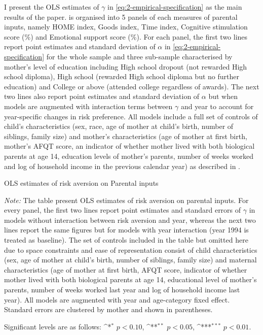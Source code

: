 \documentclass[]{article}
\begin{document}
I present the OLS estimates of $\gamma$ in \eqref{eq:2-empirical-specification}  as the main results of the paper.  is organised into 5 panels of each measures of parental inputs, namely HOME index, Goods index, Time index, Cognitive stimulation score (\%) and Emotional support score (\%). For each panel, the first two lines report point estimates and standard deviation of $\alpha$ in \eqref{eq:2-empirical-specification} for the whole sample and three sub-sample characterised by mother's level of education including High school dropout (not rewarded High school diploma), High school (rewarded High school diploma but no further education) and College or above (attended college regardless of awards). The next two lines also report point estimates and standard deviation of $\alpha$ but when models are augmented with interaction terms between $\gamma$ and year to account for year-specific changes in risk preference. All models include a full set of controls of child's characteristics (sex, race, age of mother at child's birth, number of siblings, family size) and mother's characteristics (age of mother at first birth, mother's AFQT score, an indicator of whether mother lived with both biological parents at age 14, education levels of mother's parents, number of weeks worked and log of household income in the previous calendar year) as described in .

\begin{table}[!h]
	\centering
	\begin{threeparttable}
		\def\sym#1{\ifmmode^{#1}\else\(^{#1}\)\fi}
		\caption{OLS estimates of risk aversion on Parental inputs}	
		
		\label{table:6-main-result}
		\begin{tablenotes}[flushleft] \footnotesize
			\item \textit{Note:} The table present OLS estimates of risk aversion on parental inputs. For every panel, the first two lines report point estimates and standard errors of $\gamma$ in models without interaction between risk aversion and year, whereas the next two lines report the same figures but for models with year interaction (year 1994 is treated as baseline). The set of controls included in the table but omitted here due to space constraints and ease of representation consist of child characteristics (sex, age of mother at child's birth, number of siblings, family size) and maternal characteristics (age of mother at first birth, AFQT score, indicator of whether mother lived with both biological parents at age 14, educational level of mother's parents, number of weeks worked last year and log of household income last year). All models are augmented with year and age-category fixed effect. Standard errors are clustered by mother and shown in parentheses.
			\item Significant levels are as follows: \sym{*} \(p<0.10\), \sym{**} \(p<0.05\), \sym{***} \(p<0.01\).
		\end{tablenotes}
	\end{threeparttable}
\end{table}
\end{document}
